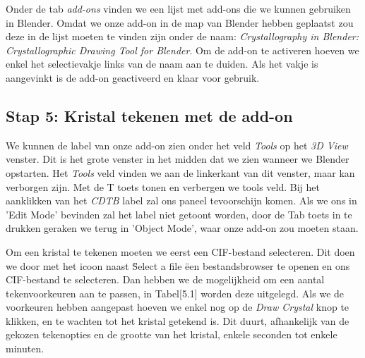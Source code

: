 Onder de tab \textit{add-ons} vinden we een lijst met add-ons die we kunnen gebruiken in Blender. Omdat we onze add-on in de map van Blender hebben geplaatst zou deze in de lijst moeten te vinden zijn onder de naam: \textit{Crystallography in Blender: Crystallographic Drawing Tool for Blender}. Om de add-on te activeren hoeven we enkel het selectievakje links van de naam aan te duiden. Als het vakje is aangevinkt is de add-on geactiveerd en klaar voor gebruik.

\subsection{Stap 5: Kristal tekenen met de add-on}
We kunnen de label van onze add-on zien onder het veld \textit{Tools} op het \textit{3D View} venster. Dit is het grote venster in het midden dat we zien wanneer we Blender opstarten. Het \textit{Tools} veld vinden we aan de linkerkant van dit venster, maar kan verborgen zijn. Met de T toets tonen en verbergen we tools veld. Bij het aanklikken van het \textit{CDTB} label zal ons paneel tevoorschijn komen. Als we ons in 'Edit Mode' bevinden zal het label niet getoont worden, door de Tab toets in te drukken geraken we terug in 'Object Mode', waar onze add-on zou moeten staan.  
\par   


Om een kristal te tekenen moeten we eerst een CIF-bestand selecteren. Dit doen we door met het icoon naast \" Select a file \" een bestandsbrowser te openen en ons CIF-bestand te selecteren. Dan hebben we de mogelijkheid om een aantal tekenvoorkeuren aan te passen, in Tabel[5.1] worden deze uitgelegd. Als we de voorkeuren hebben aangepast hoeven we enkel nog op de \textit{Draw Crystal} knop te klikken, en te wachten tot het kristal getekend is. Dit duurt, afhankelijk van de gekozen tekenopties en de grootte van het kristal, enkele seconden tot enkele minuten.
\par

